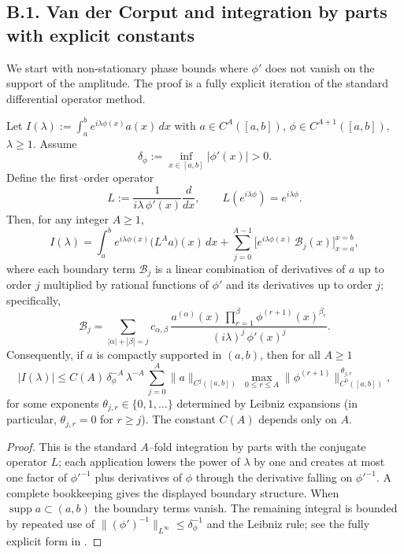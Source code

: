 \subsection*{B.1. Van der Corput and integration by parts with explicit constants}
\label{appB:vdC}

We start with non-stationary phase bounds where $\phi'$ does not vanish on the support of the amplitude. The proof is a fully explicit iteration of the standard differential operator method.

\begin{theorem}
\label{thm:nonstationary-IBP}
Let $I(\lambda):=\int_{a}^{b} e^{i\lambda \phi(x)} a(x)\,dx$ with $a\in C^{A}([a,b])$, $\phi\in C^{A+1}([a,b])$, $\lambda\ge 1$. Assume
\[
\delta_\phi := \inf_{x\in [a,b]} |\phi'(x)| > 0.
\]
Define the first–order operator
\[
L := \frac{1}{i\lambda\,\phi'(x)}\frac{d}{dx},\qquad L\!\left(e^{i\lambda \phi}\right)=e^{i\lambda \phi}.
\]
Then, for any integer $A\ge 1$,
\[
I(\lambda)=\int_{a}^{b} e^{i\lambda \phi(x)} \big(L^A a\big)(x)\,dx + \sum_{j=0}^{A-1} \Big[ e^{i\lambda \phi(x)} \, \mathcal{B}_j(x) \Big]_{x=a}^{x=b},
\]
where each boundary term $\mathcal{B}_j$ is a linear combination of derivatives of $a$ up to order $j$ multiplied by rational functions of $\phi'$ and its derivatives up to order $j$; specifically,
\[
\mathcal{B}_j = \sum_{|\alpha|+|\beta|=j} c_{\alpha,\beta}\,
\frac{a^{(\alpha)}(x)\, \prod_{r=1}^{\beta} \phi^{(r+1)}(x)^{\beta_r}}{(i\lambda)^j\,\phi'(x)^{j}} .
\]
Consequently, if $a$ is compactly supported in $(a,b)$, then for all $A\ge1$
\[
|I(\lambda)| \le C(A)\, \delta_\phi^{-A}\, \lambda^{-A}\,
\sum_{j=0}^{A}\|a\|_{C^{j}([a,b])}\, \max_{0\le r\le A}\|\phi^{(r+1)}\|_{C^{0}([a,b])}^{\, \theta_{j,r}},
\]
for some exponents $\theta_{j,r}\in \{0,1,\dots\}$ determined by Leibniz expansions (in particular, $\theta_{j,r}=0$ for $r\ge j$). The constant $C(A)$ depends only on $A$.
\end{theorem}

\begin{proof}
This is the standard $A$–fold integration by parts with the conjugate operator $L$; each application lowers the power of $\lambda$ by one and creates at most one factor of $\phi'^{-1}$ plus derivatives of $\phi$ through the derivative falling on $\phi'^{-1}$. A complete bookkeeping gives the displayed boundary structure. When $\operatorname{supp}a\subset (a,b)$ the boundary terms vanish. The remaining integral is bounded by repeated use of $\|(\phi')^{-1}\|_{L^\infty}\le \delta_\phi^{-1}$ and the Leibniz rule; see the fully explicit form in \cite[§VIII.1]{SteinHA}.
\end{proof}

